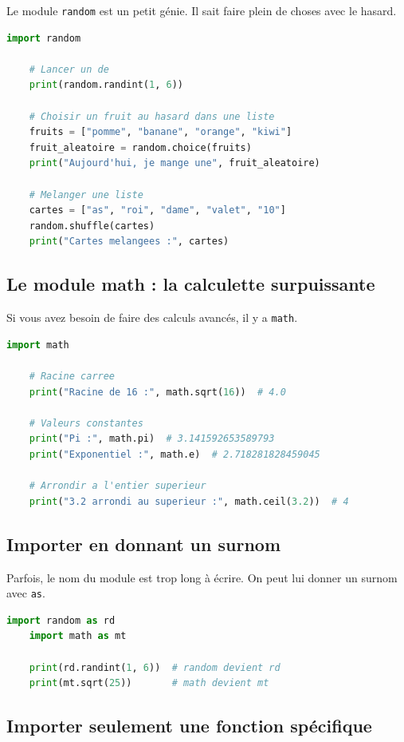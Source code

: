 \documentclass[12pt,a4paper]{article}
\begin{document}
Le module \texttt{random} est un petit génie. Il sait faire plein de choses avec le hasard.

\begin{lstlisting}[language=Python]
	import random
	
	# Lancer un de
	print(random.randint(1, 6))
	
	# Choisir un fruit au hasard dans une liste
	fruits = ["pomme", "banane", "orange", "kiwi"]
	fruit_aleatoire = random.choice(fruits)
	print("Aujourd'hui, je mange une", fruit_aleatoire)
	
	# Melanger une liste
	cartes = ["as", "roi", "dame", "valet", "10"]
	random.shuffle(cartes)
	print("Cartes melangees :", cartes)
\end{lstlisting}

\subsection{Le module math : la calculette surpuissante}

Si vous avez besoin de faire des calculs avancés, il y a \texttt{math}.

\begin{lstlisting}[language=Python]
	import math
	
	# Racine carree
	print("Racine de 16 :", math.sqrt(16))  # 4.0
	
	# Valeurs constantes
	print("Pi :", math.pi)  # 3.141592653589793
	print("Exponentiel :", math.e)  # 2.718281828459045
	
	# Arrondir a l'entier superieur
	print("3.2 arrondi au superieur :", math.ceil(3.2))  # 4
\end{lstlisting}

\subsection{Importer en donnant un surnom}

Parfois, le nom du module est trop long à écrire. On peut lui donner un surnom avec \texttt{as}.

\begin{lstlisting}[language=Python]
	import random as rd
	import math as mt
	
	print(rd.randint(1, 6))  # random devient rd
	print(mt.sqrt(25))       # math devient mt
\end{lstlisting}

\subsection{Importer seulement une fonction spécifique}
\end{document}
